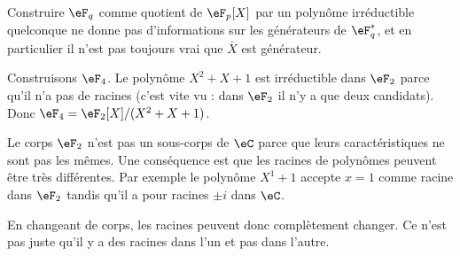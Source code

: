 Construire \( \eF_q\) comme quotient de \( \eF_p[X]\) par un polynôme irréductible quelconque ne donne pas d'informations sur les générateurs de \( \eF_q^*\), et en particulier il n'est pas toujours vrai que \( \bar X\) est générateur.

\begin{example}
    Construisons \( \eF_4\). Le polynôme \( X^2+X+1\) est irréductible dans \( \eF_2\) parce qu'il n'a pas de racines (c'est vite vu : dans \( \eF_2\) il n'y a que deux candidats). Donc \( \eF_4=\eF_2[X]/(X^2+X+1)\).
\end{example}

\begin{remark}
    Le corps \( \eF_2\) n'est pas un sous-corps de \( \eC\) parce que leurs caractéristiques ne sont pas les mêmes. Une conséquence est que les racines de polynômes peuvent être très différentes. Par exemple le polynôme \( X^1+1\) accepte \( x=1\) comme racine dans \( \eF_2\) tandis qu'il a pour racines \( \pm i\) dans \( \eC\).

    En changeant de corps, les racines peuvent donc complètement changer. Ce n'est pas juste qu'il y a des racines dans l'un et pas dans l'autre.
\end{remark}

